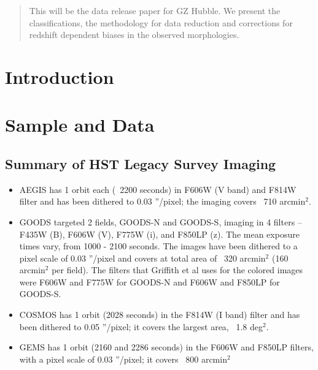 \documentclass[usenatbib]{mn2e}
\begin{document}
\maketitle

\begin{abstract}

This will be the data release paper for GZ Hubble. We present the classifications, the methodology for data reduction and corrections for redshift dependent biases in the observed morphologies. 

\end{abstract}


\section{Introduction}


\section{Sample and Data} 

\subsection{Summary of HST Legacy Survey Imaging}

\begin{itemize}
\item AEGIS has 1 orbit each (~2200 seconds) in F606W (V band) and F814W filter and has been dithered to 0.03 ''/pixel; the imaging covers ~710 arcmin$^2$.

\item GOODS targeted 2 fields, GOODS-N and GOODS-S, imaging in 4 filters -- F435W (B), F606W (V), F775W (i), and F850LP (z). The mean exposure times vary, from 1000 - 2100 seconds. The images have been dithered to a pixel scale of 0.03 ''/pixel and covers at total area of ~320 arcmin$^2$ (160 arcmin$^2$ per field). The filters that Griffith et al uses for the colored images were F606W and F775W for GOODS-N and F606W and F850LP for GOODS-S.

\item COSMOS has 1 orbit (2028 seconds) in the F814W (I band) filter and has been dithered to 0.05 ''/pixel; it covers the largest area, ~1.8 deg$^2$. 

\item GEMS has 1 orbit (2160 and 2286 seconds) in the F606W and F850LP filters, with a pixel scale of 0.03 ''/pixel; it covers ~800 arcmin$^2$
\end{itemize}
\end{document}

